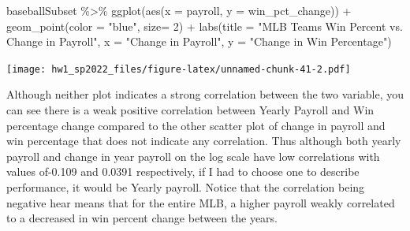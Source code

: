 \documentclass[
]{article}
\newenvironment{Shaded}{\begin{snugshade}}{\end{snugshade}}
\newcommand{\AttributeTok}[1]{\textcolor[rgb]{0.77,0.63,0.00}{#1}}
\newcommand{\DecValTok}[1]{\textcolor[rgb]{0.00,0.00,0.81}{#1}}
\newcommand{\FunctionTok}[1]{\textcolor[rgb]{0.00,0.00,0.00}{#1}}
\newcommand{\NormalTok}[1]{#1}
\newcommand{\SpecialCharTok}[1]{\textcolor[rgb]{0.00,0.00,0.00}{#1}}
\newcommand{\StringTok}[1]{\textcolor[rgb]{0.31,0.60,0.02}{#1}}
\begin{document}
\begin{Shaded}
\begin{Highlighting}[]
\NormalTok{baseballSubset }\SpecialCharTok{\%\textgreater{}\%}
  \FunctionTok{ggplot}\NormalTok{(}\FunctionTok{aes}\NormalTok{(}\AttributeTok{x =}\NormalTok{ payroll, }\AttributeTok{y =}\NormalTok{ win\_pct\_change)) }\SpecialCharTok{+} 
  \FunctionTok{geom\_point}\NormalTok{(}\AttributeTok{color =} \StringTok{"blue"}\NormalTok{, }\AttributeTok{size=} \DecValTok{2}\NormalTok{) }\SpecialCharTok{+} 
  \FunctionTok{labs}\NormalTok{(}\AttributeTok{title =} \StringTok{"MLB Team\textquotesingle{}s Win Percent  vs. Change in Payroll"}\NormalTok{, }
       \AttributeTok{x =} \StringTok{"Change in Payroll"}\NormalTok{, }
       \AttributeTok{y =} \StringTok{"Change in Win Percentage"}\NormalTok{)}
\end{Highlighting}
\end{Shaded}

\texttt{[image: hw1\_sp2022\_files/figure-latex/unnamed-chunk-41-2.pdf]}

Although neither plot indicates a strong correlation between the two
variable, you can see there is a weak positive correlation between
Yearly Payroll and Win percentage change compared to the other scatter
plot of change in payroll and win percentage that does not indicate any
correlation. Thus although both yearly payroll and change in year
payroll on the log scale have low correlations with values of-0.109 and
0.0391 respectively, if I had to choose one to describe performance, it
would be Yearly payroll. Notice that the correlation being negative hear
means that for the entire MLB, a higher payroll weakly correlated to a
decreased in win percent change between the years.
\end{document}

